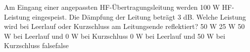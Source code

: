     {Am Eingang einer angepassten HF-Übertragungsleitung werden 100 W HF-Leistung eingespeist. Die Dämpfung der Leitung beträgt 3 dB. Welche Leistung wird bei Leerlauf oder Kurzschluss am Leitungsende reflektiert?}
    {50 W}
    {25 W}
    {50 W bei Leerlauf und 0 W bei Kurzschluss}
    {0 W bei Leerlauf und 50 W bei Kurzschluss}
    {false}{false}
